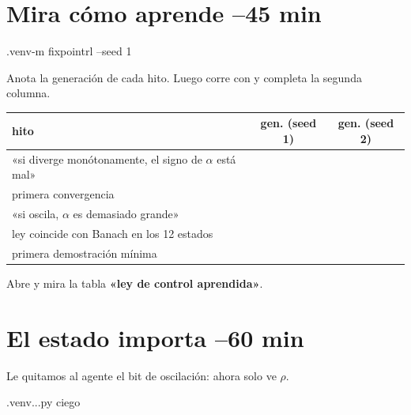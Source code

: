 \section{Mira cómo aprende \hfill\small{}–45 min}
\begin{orden}
.venv\Scripts\python -m fixpointrl --seed 1
\end{orden}
Anota la generación de cada hito. Luego corre con  y completa la segunda columna.

\renewcommand{\arraystretch}{2.1}
\begin{tabularx}{\linewidth}{|X|c|c|}
\hline
\textbf{hito} & \textbf{gen. (seed 1)} & \textbf{gen. (seed 2)} \\
\hline
«si diverge monótonamente, el signo de $\alpha$ está mal» & \hspace{2.6cm} & \hspace{2.6cm} \\
\hline
primera convergencia & & \\
\hline
«si oscila, $\alpha$ es demasiado grande» & & \\
\hline
ley coincide con Banach en los 12 estados & & \\
\hline
primera demostración mínima & & \\
\hline
\end{tabularx}
\renewcommand{\arraystretch}{1.25}

Abre  y mira la tabla \textbf{«ley de control aprendida»}.
\begin{preguntas}
\end{preguntas}

\section{El estado importa \hfill\small{}–60 min}
Le quitamos al agente el bit de oscilación: ahora solo ve $\rho$.
\begin{orden}
.venv\Scripts\python ..\docs\curso{}\experimentos.py ciego
\end{orden}
\begin{preguntas}
\end{preguntas}

